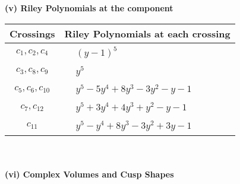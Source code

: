 \documentclass[1p]{elsarticle_modified}
\theoremstyle{definition}
\begin{document}
\newpage\renewcommand{\arraystretch}{1}
\flushleft \textbf{(v) Riley Polynomials at the component}\newline \\
\begin{tabular}{m{50pt}|m{274pt}}
Crossings & \hspace{64pt}Riley Polynomials at each crossing \\
\hline $$\begin{aligned}c_{1},c_{2},c_{4}\end{aligned}$$&$\begin{aligned}
&(y-1)^5
\end{aligned}$\\
\hline $$\begin{aligned}c_{3},c_{8},c_{9}\end{aligned}$$&$\begin{aligned}
&y^5
\end{aligned}$\\
\hline $$\begin{aligned}c_{5},c_{6},c_{10}\end{aligned}$$&$\begin{aligned}
&y^5-5 y^4+8 y^3-3 y^2- y-1
\end{aligned}$\\
\hline $$\begin{aligned}c_{7},c_{12}\end{aligned}$$&$\begin{aligned}
&y^5+3 y^4+4 y^3+y^2- y-1
\end{aligned}$\\
\hline $$\begin{aligned}c_{11}\end{aligned}$$&$\begin{aligned}
&y^5- y^4+8 y^3-3 y^2+3 y-1
\end{aligned}$\\
\hline
\end{tabular}\\~\\
\newpage\flushleft \textbf{(vi) Complex Volumes and Cusp Shapes}
\end{document}
